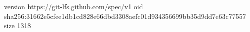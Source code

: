 version https://git-lfs.github.com/spec/v1
oid sha256:31662e5cfee1db1cd828e66dbd3308aefc01d934356699bb35d9dd7e63c77557
size 1318
